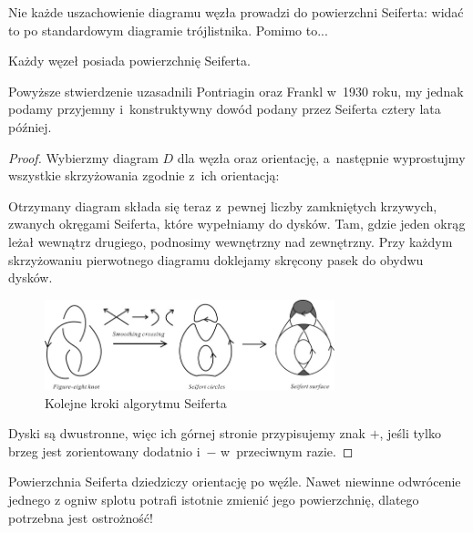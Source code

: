 Nie każde uszachowienie diagramu węzła prowadzi do powierzchni Seiferta: widać to po standardowym diagramie trójlistnika.
Pomimo to...

\begin{proposition}
\label{prp:seifert_exists}%
    Każdy węzeł posiada powierzchnię Seiferta.
\end{proposition}

Powyższe stwierdzenie uzasadnili Pontriagin oraz Frankl w~1930 roku, my jednak podamy przyjemny i~konstruktywny dowód podany przez Seiferta \cite{seifert1935} cztery lata później.
%

\begin{proof}
%
    Wybierzmy diagram $D$ dla węzła oraz orientację,
    a~następnie wyprostujmy wszystkie skrzyżowania zgodnie z~ich orientacją:

    Otrzymany diagram składa się teraz z~pewnej liczby zamkniętych krzywych,
    zwanych okręgami Seiferta, które wypełniamy do dysków.
    Tam, gdzie jeden okrąg leżał wewnątrz drugiego, podnosimy wewnętrzny nad zewnętrzny.
    Przy każdym skrzyżowaniu pierwotnego diagramu doklejamy skręcony pasek do obydwu dysków.

    \begin{figure}[H]
        \centering
        \includegraphics[width=0.75\textwidth]{../data/seifert-algorithm.jpg}
        \caption[Smthing]{Kolejne kroki algorytmu Seiferta}
    \end{figure}

    Dyski są dwustronne, więc ich górnej stronie przypisujemy znak $+$,
    jeśli tylko brzeg jest zorientowany dodatnio i~$-$ w~przeciwnym razie.
%
\end{proof}

Powierzchnia Seiferta dziedziczy orientację po węźle.
Nawet niewinne odwrócenie jednego z ogniw splotu potrafi istotnie zmienić jego powierzchnię, dlatego potrzebna jest ostrożność!

%


